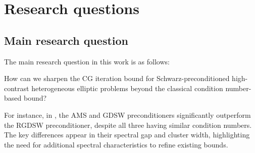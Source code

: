 \chapter{Research questions}\label{ch:questions}\newpage
\section{Main research question}
The main research question in this work is as follows:
\begin{researchq} \label{rq:main}
    \par
    How can we sharpen the CG iteration bound for Schwarz-preconditioned high-contrast heterogeneous elliptic problems beyond the classical condition number-based bound?
\end{researchq}
For instance, in \cite{ams_coarse_space_comp_study_Alves2024}, the AMS and GDSW preconditioners significantly outperform the RGDSW preconditioner, despite all three having similar condition numbers. The key differences appear in their spectral gap and cluster width, highlighting the need for additional spectral characteristics to refine existing bounds.

